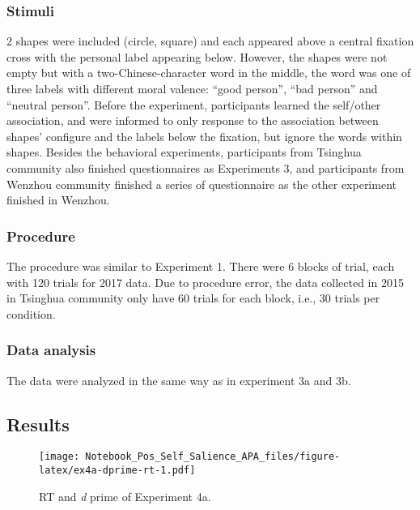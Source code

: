 \documentclass[man]{apa6}
\begin{document}
\hypertarget{stimuli-1}{%
\subsubsection{Stimuli}\label{stimuli-1}}

2 shapes were included (circle, square) and each appeared above a central fixation cross with the personal label appearing below. However, the shapes were not empty but with a two-Chinese-character word in the middle, the word was one of three labels with different moral valence: \enquote{good person}, \enquote{bad person} and \enquote{neutral person}. Before the experiment, participants learned the self/other association, and were informed to only response to the association between shapes' configure and the labels below the fixation, but ignore the words within shapes. Besides the behavioral experiments, participants from Tsinghua community also finished questionnaires as Experiments 3, and participants from Wenzhou community finished a series of questionnaire as the other experiment finished in Wenzhou.

\hypertarget{procedure-6}{%
\subsubsection{Procedure}\label{procedure-6}}

The procedure was similar to Experiment 1. There were 6 blocks of trial, each with 120 trials for 2017 data. Due to procedure error, the data collected in 2015 in Tsinghua community only have 60 trials for each block, i.e., 30 trials per condition.

\hypertarget{data-analysis-6}{%
\subsubsection{Data analysis}\label{data-analysis-6}}

The data were analyzed in the same way as in experiment 3a and 3b.

\hypertarget{results-6}{%
\subsection{Results}\label{results-6}}

\begin{figure}
\centering
\texttt{[image: Notebook\_Pos\_Self\_Salience\_APA\_files/figure-latex/ex4a-dprime-rt-1.pdf]}
\caption{\label{fig:ex4a-dprime-rt}RT and \emph{d} prime of Experiment 4a.}
\end{figure}
\end{document}
